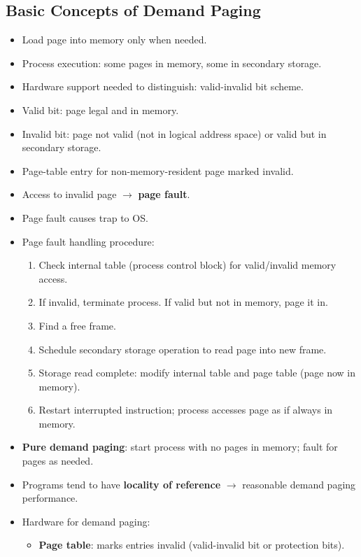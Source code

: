 \subsection{Basic Concepts of Demand Paging}
\begin{itemize}
    \item Load page into memory only when needed.
    \item Process execution: some pages in memory, some in secondary storage.
    \item Hardware support needed to distinguish: valid-invalid bit scheme.
    \item Valid bit: page legal and in memory.
    \item Invalid bit: page not valid (not in logical address space) or valid but in secondary storage.
    \item Page-table entry for non-memory-resident page marked invalid.
    \item Access to invalid page $\rightarrow$ \textbf{page fault}.
    \item Page fault causes trap to OS.
    \item Page fault handling procedure:
    \begin{enumerate}
        \item Check internal table (process control block) for valid/invalid memory access.
        \item If invalid, terminate process. If valid but not in memory, page it in.
        \item Find a free frame.
        \item Schedule secondary storage operation to read page into new frame.
        \item Storage read complete: modify internal table and page table (page now in memory).
        \item Restart interrupted instruction; process accesses page as if always in memory.
    \end{enumerate}
    \item \textbf{Pure demand paging}: start process with no pages in memory; fault for pages as needed.
    \item Programs tend to have \textbf{locality of reference} $\rightarrow$ reasonable demand paging performance.
    \item Hardware for demand paging:
    \begin{itemize}
        \item \textbf{Page table}: marks entries invalid (valid-invalid bit or protection bits).

\end{itemize}
\end{itemize}
